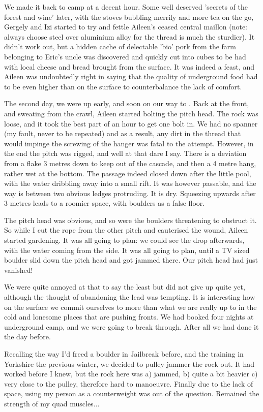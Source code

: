 We made it back to camp at a decent hour. Some well deserved 'secrets of the forest and wine' later, with the stoves bubbling merrily and more tea on the go, Gergely and Izi started to try and fettle Aileen's ceased central maillon (note: always choose steel over aluminium alloy for the thread is much the sturdier). It didn't work out, but a hidden cache of delectable 'bio' pork from the farm belonging to Eric's uncle was discovered and quickly cut into cubes to be had with local cheese and bread brought from the surface. It was indeed a feast, and Aileen was undoubtedly right in saying that the quality of underground food had to be even higher than on the surface to counterbalance the lack of comfort.

The second day, we were up early, and soon on our way to . Back at the front, and sweating from the crawl, Aileen started bolting the pitch head. The rock was loose, and it took the best part of an hour to get one bolt in. We had no spanner (my fault, never to be repeated) and as a result, any dirt in the thread that would impinge the screwing of the hanger was fatal to the attempt. However, in the end the pitch was rigged, and well at that dare I say. There is a deviation from a flake 3 metres down to keep out of the cascade, and then a 4 metre hang, rather wet at the bottom. The passage indeed closed down after the little pool, with the water dribbling away into a small rift. It was however passable, and the way is between two obvious ledges protruding. It is dry. Squeezing upwards after 3 metres leads to a roomier space, with boulders as a false floor.

The pitch head was obvious, and so were the boulders threatening to obstruct it. So while I cut the rope from the other pitch and cauterised the wound, Aileen started gardening. It was all going to plan: we could see the drop afterwards, with the water coming from the side. It was all going to plan, until a TV sized boulder slid down the pitch head and got jammed there. Our pitch head had just vanished!

We were quite annoyed at that to say the least but did not give up quite yet, although the thought of abandoning the lead  was tempting. It is interesting how on the surface we commit ourselves to more than what we are really up to in the cold and lonesome places that are pushing fronts. We had booked four nights at underground camp, and we were going to break through. After all we had done it the day before.

Recalling the way I'd freed a boulder in Jailbreak before, and the training in Yorkshire the previous winter, we decided to pulley-jammer the rock out. It had worked before I knew, but the rock here was a) jammed, b) quite a bit heavier c) very close to the pulley, therefore hard to manoeuvre. Finally due to the lack of space, using my person as a counterweight was out of the question. Remained the strength of my quad muscles...

